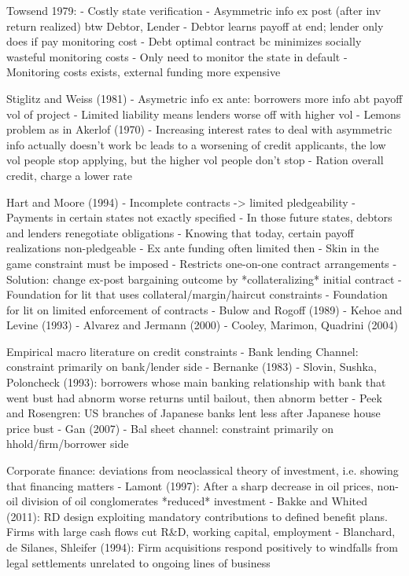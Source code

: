 \documentclass[12pt]{article}
\theoremstyle{plain}
\theoremstyle{definition}
\theoremstyle{remark}
\begin{document}
Towsend 1979:
- Costly state verification
- Asymmetric info ex post (after inv return realized) btw Debtor, Lender
- Debtor learns payoff at end; lender only does if pay monitoring cost
- Debt optimal contract bc minimizes socially wasteful monitoring costs
- Only need to monitor the state in default
- Monitoring costs exists, external funding more expensive

Stiglitz and Weiss (1981)
- Asymetric info ex ante: borrowers more info abt payoff vol of project
- Limited liability means lenders worse off with higher vol
- Lemons problem as in Akerlof (1970)
- Increasing interest rates to deal with asymmetric info actually
doesn't work bc leads to a worsening of credit applicants, the low vol
people stop applying, but the higher vol people don't stop
- Ration overall credit, charge a lower rate

Hart and Moore (1994)
- Incomplete contracts -> limited pledgeability
- Payments in certain states not exactly specified
- In those future states, debtors and lenders renegotiate obligations
- Knowing that today, certain payoff realizations non-pledgeable
- Ex ante funding often limited then
- Skin in the game constraint must be imposed
- Restricts one-on-one contract arrangements
- Solution: change ex-post bargaining outcome by *collateralizing*
initial contract
- Foundation for lit that uses collateral/margin/haircut constraints
- Foundation for lit on limited enforcement of contracts
  - Bulow and Rogoff (1989)
  - Kehoe and Levine (1993)
  - Alvarez and Jermann (2000)
  - Cooley, Marimon, Quadrini (2004)


Empirical macro literature on credit constraints
- Bank lending Channel: constraint primarily on bank/lender side
  - Bernanke (1983)
  - Slovin, Sushka, Poloncheck (1993): borrowers whose main banking
    relationship with bank that went bust had abnorm worse returns until
    bailout, then abnorm better
  - Peek and Rosengren: US branches of Japanese banks lent less after
    Japanese house price bust
  - Gan (2007)
- Bal sheet channel: constraint primarily on hhold/firm/borrower side

Corporate finance: deviations from neoclassical theory of investment,
i.e. showing that financing matters
- Lamont (1997): After a sharp decrease in oil prices, non-oil division
of oil conglomerates *reduced* investment
- Bakke and Whited (2011): RD design exploiting mandatory contributions
to defined benefit plans. Firms with large cash flows cut R\&D, working
capital, employment
- Blanchard, de Silanes, Shleifer (1994): Firm acquisitions respond
positively to windfalls from legal settlements unrelated to ongoing
lines of business
\end{document}
